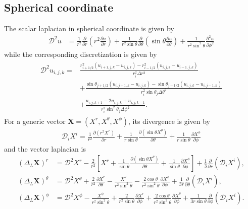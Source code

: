 \subsection{Spherical coordinate}
The scalar laplacian in spherical coordinate is given by
\begin{align}
    \mathcal{D}^2 u &= \frac{1}{r^2} \frac{\partial}{\partial r} \left( r^2 \frac{\partial u}{\partial r} \right)
        + \frac{1}{r^2 \sin{\theta}} \frac{\partial}{\partial \theta} \left( \sin{\theta} \frac{\partial u}{\partial \theta} \right) 
        + \frac{1}{r^2 \sin^2{\theta}} \frac{\partial^2 u}{\partial \phi^2}
\end{align}
while the corresponding discretization is given by
\begin{align}
\begin{split}
    \mathcal{D}^2 u_{i,j,k} =& \frac{r_{i+1/2}^2 \left(u_{i+1,j,k} - u_{i,j,k} \right)
            - r_{i-1/2}^2 \left(u_{i,j,k} - u_{i-1,j,k} \right)}{r_i^2 \Delta r^2} \\
            &+ \frac{ \sin{\theta_{j+1/2}} \left(u_{i,j+1,k} - u_{i,j,k} \right)
            - \sin{\theta_{j-1/2}} \left(u_{i,j,k} - u_{i,j-1,k} \right)}{r_i^2 \sin{\theta_j} \Delta \theta^2} \\
            &+ \frac{ u_{i,j,k+1} - 2 u_{i,j,k} + u_{i,j,k-1}}{r_i^2 \sin^2{\theta_j}\Delta \phi^2}.
\end{split}
\end{align}
For a generic vector $\mathbf{X} = \left(X^r, X^\theta, X^\phi \right)$, its divergence is given by
\begin{align}
    \mathcal{D}_i X^i = \frac{1}{r^2} \frac{\partial \left(r^2 X^r\right)}{\partial r} 
            + \frac{1}{r\sin\theta}\frac{\partial \left(\sin\theta X^\theta\right)}{\partial \theta}
            + \frac{1}{r\sin\theta}\frac{\partial X^\phi}{\partial \phi}
\end{align}
and the vector laplacian is
\begin{align}
    \left(\Delta_L \mathbf{X}\right)^r &= \mathcal{D}^2 X^r 
            - \frac{2}{r^2}\left[ X^r + \frac{1}{\sin\theta}\frac{\partial \left(\sin\theta X^\theta\right)}{\partial \theta} 
            + \frac{1}{\sin\theta} \frac{\partial X^\phi}{\partial \phi}\right]
            + \frac{1}{3}\frac{\partial}{\partial r}\left( \mathcal{D}_i X^i \right), \\
    \left(\Delta_L \mathbf{X}\right)^\theta &= \mathcal{D}^2 X^\theta 
            + \frac{2}{r^2}\frac{\partial X^r}{\partial \theta} - \frac{X^\theta}{r^2 \sin^2\theta}
            - \frac{2 \cos\theta}{r^2\sin^2\theta}\frac{\partial X^\phi}{\partial \phi}
            + \frac{1}{3 r}\frac{\partial}{\partial \theta}\left( \mathcal{D}_i X^i \right), \\
    \left(\Delta_L \mathbf{X}\right)^\phi &= \mathcal{D}^2 X^\phi 
            - \frac{X^\phi}{r^2 \sin^2\theta} + \frac{2}{r^2\sin\theta}\frac{\partial X^r}{\partial \phi}
            + \frac{2 \cos\theta}{r^2\sin^2\theta}\frac{\partial X^\theta}{\partial \phi}
            + \frac{1}{3 r\sin\theta}\frac{\partial}{\partial \phi}\left( \mathcal{D}_i X^i \right).
\end{align}

